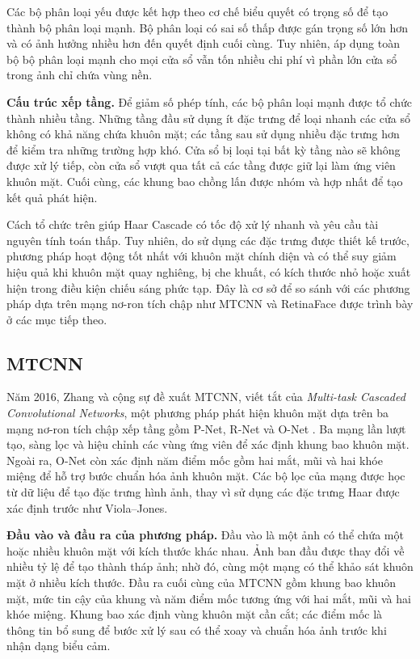 \documentclass[../LuanVan.tex]{subfiles}
\begin{document}
Các bộ phân loại yếu được kết hợp theo cơ chế biểu quyết có trọng số để tạo thành bộ phân loại mạnh. Bộ phân loại có sai số thấp được gán trọng số lớn hơn và có ảnh hưởng nhiều hơn đến quyết định cuối cùng. Tuy nhiên, áp dụng toàn bộ bộ phân loại mạnh cho mọi cửa sổ vẫn tốn nhiều chi phí vì phần lớn cửa sổ trong ảnh chỉ chứa vùng nền.

\noindent\textbf{Cấu trúc xếp tầng.} Để giảm số phép tính, các bộ phân loại mạnh được tổ chức thành nhiều tầng. Những tầng đầu sử dụng ít đặc trưng để loại nhanh các cửa sổ không có khả năng chứa khuôn mặt; các tầng sau sử dụng nhiều đặc trưng hơn để kiểm tra những trường hợp khó. Cửa sổ bị loại tại bất kỳ tầng nào sẽ không được xử lý tiếp, còn cửa sổ vượt qua tất cả các tầng được giữ lại làm ứng viên khuôn mặt. Cuối cùng, các khung bao chồng lấn được nhóm và hợp nhất để tạo kết quả phát hiện.

Cách tổ chức trên giúp Haar Cascade có tốc độ xử lý nhanh và yêu cầu tài nguyên tính toán thấp. Tuy nhiên, do sử dụng các đặc trưng được thiết kế trước, phương pháp hoạt động tốt nhất với khuôn mặt chính diện và có thể suy giảm hiệu quả khi khuôn mặt quay nghiêng, bị che khuất, có kích thước nhỏ hoặc xuất hiện trong điều kiện chiếu sáng phức tạp. Đây là cơ sở để so sánh với các phương pháp dựa trên mạng nơ-ron tích chập như MTCNN và RetinaFace được trình bày ở các mục tiếp theo.

\subsection{MTCNN}
\label{subsection:2.2.2}

Năm 2016, Zhang và cộng sự đề xuất MTCNN, viết tắt của \textit{Multi-task Cascaded Convolutional Networks}, một phương pháp phát hiện khuôn mặt dựa trên ba mạng nơ-ron tích chập xếp tầng gồm P-Net, R-Net và O-Net \cite{zhang2016mtcnn}. Ba mạng lần lượt tạo, sàng lọc và hiệu chỉnh các vùng ứng viên để xác định khung bao khuôn mặt. Ngoài ra, O-Net còn xác định năm điểm mốc gồm hai mắt, mũi và hai khóe miệng để hỗ trợ bước chuẩn hóa ảnh khuôn mặt. Các bộ lọc của mạng được học từ dữ liệu để tạo đặc trưng hình ảnh, thay vì sử dụng các đặc trưng Haar được xác định trước như Viola--Jones.

\noindent\textbf{Đầu vào và đầu ra của phương pháp.} Đầu vào là một ảnh có thể chứa một hoặc nhiều khuôn mặt với kích thước khác nhau. Ảnh ban đầu được thay đổi về nhiều tỷ lệ để tạo thành tháp ảnh; nhờ đó, cùng một mạng có thể khảo sát khuôn mặt ở nhiều kích thước. Đầu ra cuối cùng của MTCNN gồm khung bao khuôn mặt, mức tin cậy của khung và năm điểm mốc tương ứng với hai mắt, mũi và hai khóe miệng. Khung bao xác định vùng khuôn mặt cần cắt; các điểm mốc là thông tin bổ sung để bước xử lý sau có thể xoay và chuẩn hóa ảnh trước khi nhận dạng biểu cảm.
\end{document}

